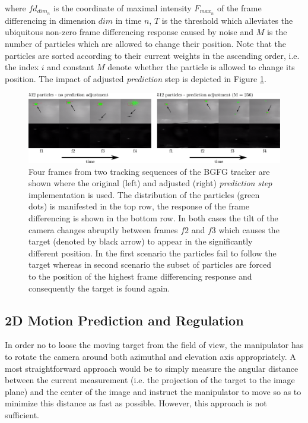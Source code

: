 where $fd_{dim_{n}}$ is the coordinate of maximal intensity $F_{max_{n}}$ of the frame differencing in dimension $dim$ in time $n$, $T$ is the threshold which alleviates the ubiquitous non-zero frame differencing response caused by noise and $M$ is the number of particles which are allowed to change their position. Note that the particles are sorted according to their current weights in the ascending order, i.e. the index $i$ and constant $M$ denote whether the particle is allowed to change its position. The impact of adjusted \textit{prediction} step is depicted in Figure \ref{fig:frame_diff}. 

\begin{figure}[htb]
	\centering
	\includegraphics[width=0.99\linewidth]{fig/frame_diff.pdf}
	\caption{Four frames from two tracking sequences of the BGFG tracker are shown where the original (left) and adjusted (right) \textit{prediction step} implementation is used. The distribution of the particles (green dots) is manifested in the top row, the response of the frame differencing is shown in the bottom row. In both cases the tilt of the camera changes abruptly between frames $f 2$ and $f 3$ which causes the target (denoted by black arrow) to appear in the significantly different position. In the first scenario the particles fail to follow the target whereas in second scenario the subset of particles are forced to the position of the highest frame differencing response and consequently the target is found again.}
	\label{fig:frame_diff}
\end{figure}

\subsection{2D Motion Prediction and Regulation} \label{txt:2d_motion_prediction_and_regulation}

In order no to loose the moving target from the field of view, the manipulator has to rotate the camera around both azimuthal and elevation axis appropriately. A most straightforward approach would be to simply measure the angular distance between the current measurement (i.e. the projection of the target to the image plane) and the center of the image and instruct the manipulator to move so as to minimize this distance as fast as possible. However, this approach is not sufficient. 


